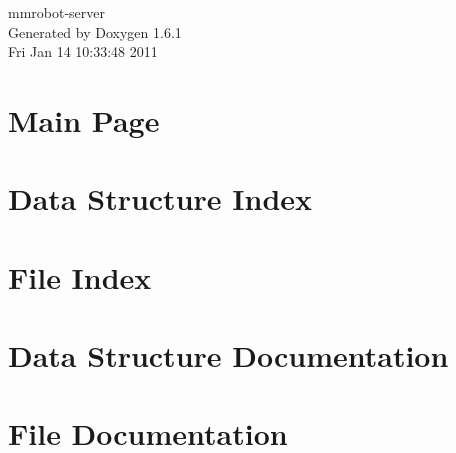 \documentclass[a4paper]{book}
\begin{document}
\begin{titlepage}
\vspace*{7cm}
\begin{center}
{\Large mmrobot-\/server }\\
\vspace*{1cm}
{\large Generated by Doxygen 1.6.1}\\
\vspace*{0.5cm}
{\small Fri Jan 14 10:33:48 2011}\\
\end{center}
\end{titlepage}
\clearemptydoublepage
{}
\tableofcontents
\clearemptydoublepage
{}
\chapter{Main Page}
\label{index}
\chapter{Data Structure Index}

\chapter{File Index}

\chapter{Data Structure Documentation}









\chapter{File Documentation}
























\printindex
\end{document}
